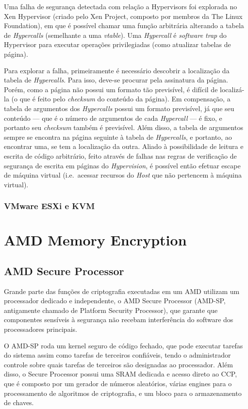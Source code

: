 \documentclass{report}
\begin{document}
Uma falha de segurança detectada com relação a Hypervisors foi explorada no Xen
Hypervisor (criado pelo Xen Project, composto por membros da The Linux
Foundation), em que é possível chamar uma função arbitrária alterando a tabela
de \textit{Hypercalls} (semelhante a uma \textit{vtable}). Uma
\textit{Hypercall} é \textit{software trap} do Hypervisor para executar
operações privilegiadas (como atualizar tabelas de página).

Para explorar a falha, primeiramente é necessário descobrir a localização da
tabela de \textit{Hypercalls}. Para isso, deve-se procurar pela assinatura da
página. Porém, como a página não possui um formato tão previsível, é difícil de
localizá-la (o que é feito pelo \textit{checksum} do conteúdo da página). Em
compensação, a tabela de argumentos dos \textit{Hypercalls} possui um formato
previsível, já que seu conteúdo --- que é o número de argumentos de cada
\textit{Hypercall} --- é fixo, e portanto seu \textit{checksum} também é
previsível. Além disso, a tabela de argumentos sempre se encontra na página
seguinte à tabela de \textit{Hypercalls}, e portanto, ao encontrar uma, se tem
a localização da outra. Aliado à possibilidade de leitura e escrita de código
arbitrário, feito através de falhas nas regras de verificação de segurança de
escrita em páginas do \textit{Hypervision}, é possível então efetuar escape de
máquina virtual (i.e.\ acessar recursos do \textit{Host} que não pertencem à
máquina virtual).

\subsection{VMware ESXi e KVM}

\chapter{AMD Memory Encryption}

\section{AMD Secure Processor}

Grande parte das funções de criptografia executadas em um AMD utilizam um
processador dedicado e independente, o AMD Secure Processor (AMD-SP,
antigamente chamado de Platform Security Processor), que garante que
componentes sensíveis à segurança não recebam interferência do software dos
processadores principais.

O AMD-SP roda um kernel seguro de código fechado, que pode executar tarefas do
sistema assim como tarefas de terceiros confiáveis, tendo o administrador
controle sobre quais tarefas de terceiros são designadas ao processador. Além
disso, o Secure Processor possui uma SRAM dedicada e acesso direto ao CCP, que
é composto por um gerador de números aleatórios, várias engines para o
processamento de algoritmos de criptografia, e um bloco para o armazenamento de
chaves.
\end{document}
